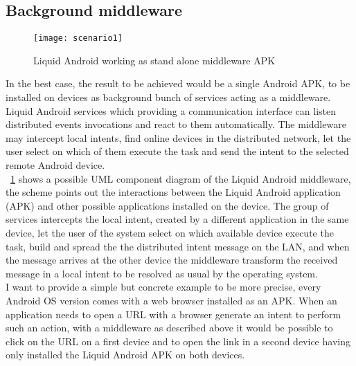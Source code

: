 \subsection{Background middleware}\label{middlewarescenario}
\begin{figure}[h!]
	\centering
	\texttt{[image: scenario1]}
	\caption{Liquid Android working as stand alone middleware APK}
	\label{fig:3.2}
\end{figure}
In the best case, the result to be achieved would be a single Android APK, to be installed on devices as background bunch of services acting as a middleware. Liquid Android services which providing a communication interface can listen distributed events invocations and react to them automatically. The middleware may intercept local intents, find online devices in the distributed network, let the user select on which of them execute the task and send the intent to the selected remote Android device.\\
\figurename~\ref{fig:3.2} shows a possible UML component diagram of the Liquid Android middleware, the scheme points out the interactions between the Liquid Android application (APK) and other possible applications installed on the device. The group of services intercepts the local intent, created by a different application in the same device, let the user of the system select on which available device execute the task, build and spread the the distributed intent message on the LAN, and when the message arrives at the other device the middleware transform the received message in a local intent to be resolved as usual by the operating system.\\
I want to provide a simple but concrete example to be more precise, every Android OS version comes with a web browser installed as an APK. When an application needs to open a URL with a browser generate an intent to perform such an action, with a middleware as described above it would be possible to click on the URL on a first device and to open the link in a second device having only installed the Liquid Android APK on both devices.\\\\\\\\

